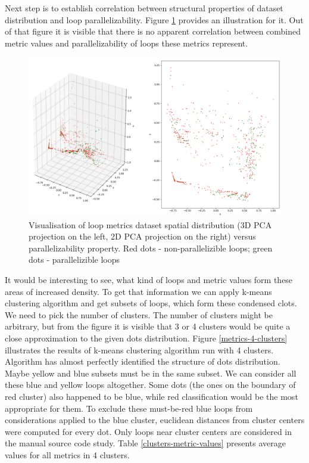 \null\qquad Next step is to establish correlation between structural properties of dataset distribution and loop parallelizability. Figure \ref{metrics-pca-parallelizability} provides an illustration for it. Out of that figure it is visible that there is no apparent correlation between combined metric values and parallelizability of loops these metrics represent. 
\begin{figure}[H]
\centering
\includegraphics[width=\linewidth]{figs/metrics-pca-parallelizability.png}
\caption{Visualisation of loop metrics dataset spatial distribution (3D PCA projection on the left, 2D PCA projection on the right) versus parallelizability property. Red dots - non-parallelizible loops; green dots - parallelizible loops}
\label{metrics-pca-parallelizability}
\end{figure} 
\null\qquad It would be interesting to see, what kind of loops and metric values form these areas of increased density. To get that information we can apply k-means clustering algorithm and get subsets of loops, which form these condensed clots. We need to pick the number of clusters. The number of clusters might be arbitrary, but from the figure it is visible that 3 or 4 clusters would be quite a close approximation to the given dots distribution. Figure \ref{metrics-4-clusters} illustrates the results of k-means clustering algorithm run with 4 clusters. Algorithm has almost perfectly identified the structure of dots distribution. Maybe yellow and blue subsets must be in the same subset. We can consider all these blue and yellow loops altogether. Some dots (the ones on the boundary of red cluster) also happened to be blue, while red classification would be the most appropriate for them. To exclude these must-be-red blue loops from considerations applied to the blue cluster, euclidean distances from cluster centers were computed for every dot. Only loops near cluster centers are considered in the manual source code study. Table \ref{clusters-metric-values} presents average values for all metrics in 4 clusters. \newline
